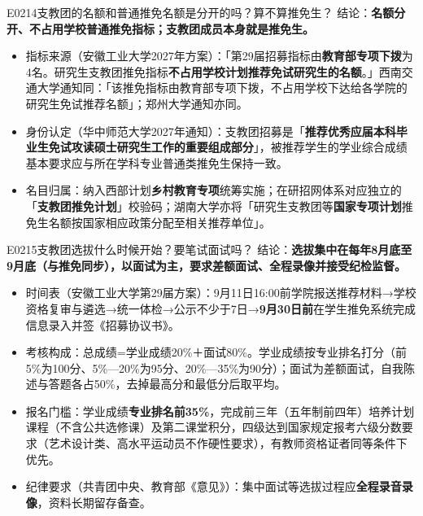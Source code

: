 \begin{qa}{E0214}{支教团的名额和普通推免名额是分开的吗？算不算推免生？}
结论：\textbf{名额分开、不占用学校普通推免指标；支教团成员本身就是推免生。}
\begin{itemize}
  \item 指标来源（安徽工业大学2027年方案）：「第29届招募指标由\textbf{教育部专项下拨}为4名。研究生支教团推免指标\textbf{不占用学校计划推荐免试研究生的名额}。」西南交通大学通知同：「该推免指标由教育部专项下拨，不占用学校下达给各学院的研究生免试推荐名额」；郑州大学通知亦同。
  \item 身份认定（华中师范大学2027年通知）：支教团招募是「\textbf{推荐优秀应届本科毕业生免试攻读硕士研究生工作的重要组成部分}」，被推荐学生的学业综合成绩基本要求应与所在学科专业普通类推免生保持一致。
  \item 名目归属：纳入西部计划\textbf{乡村教育专项}统筹实施；在研招网体系对应独立的「\textbf{支教团推免计划}」校验码；湖南大学亦将「研究生支教团等\textbf{国家专项计划}推免生名额按国家相应政策分配至相关推荐单位」。
\end{itemize}
\end{qa}

\begin{qa}{E0215}{支教团选拔什么时候开始？要笔试面试吗？}
结论：\textbf{选拔集中在每年8月底至9月底（与推免同步），以面试为主，要求差额面试、全程录像并接受纪检监督。}
\begin{itemize}
  \item 时间表（安徽工业大学第29届方案）：9月11日16:00前学院报送推荐材料→学校资格复审与遴选→统一体检→公示不少于7日→\textbf{9月30日前}在学生推免系统完成信息录入并签《招募协议书》。
  \item 考核构成：总成绩=学业成绩20\%＋面试80\%。学业成绩按专业排名打分（前5\%为100分、5\%—20\%为95分、20\%—35\%为90分）；面试为差额面试，自我陈述与答题各占50\%，去掉最高分和最低分后取平均。
  \item 报名门槛：学业成绩\textbf{专业排名前35\%}，完成前三年（五年制前四年）培养计划课程（不含公共选修课）及第二课堂积分，四级达到国家规定报考六级分数要求（艺术设计类、高水平运动员不作硬性要求），有教师资格证者同等条件下优先。
  \item 纪律要求（共青团中央、教育部《意见》）：集中面试等选拔过程应\textbf{全程录音录像}，资料长期留存备查。
\end{itemize}
\end{qa}

